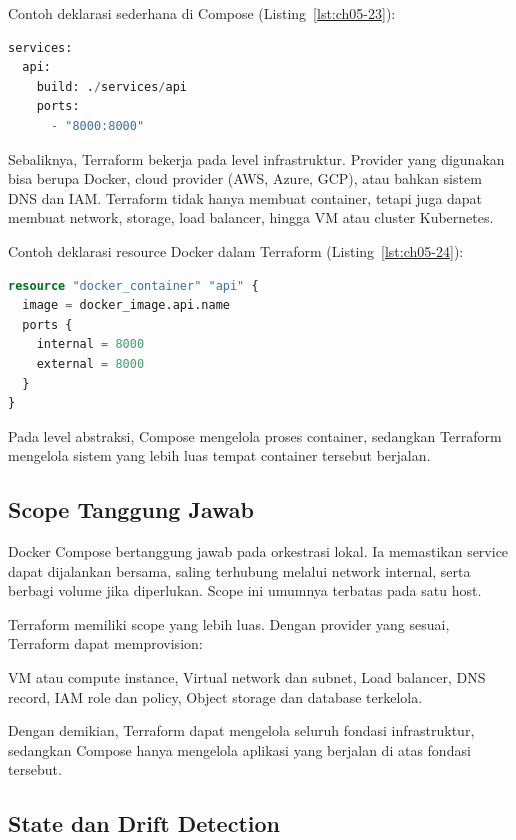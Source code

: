 Contoh deklarasi sederhana di Compose (Listing~\ref{lst:ch05-23}):

\begin{lstlisting}[language=terraform, caption={Potongan kode Terraform pada Level Abstraksi}, label={lst:ch05-23}]
services:
  api:
    build: ./services/api
    ports:
      - "8000:8000"
\end{lstlisting}

Sebaliknya, Terraform bekerja pada level infrastruktur. Provider yang digunakan bisa berupa Docker, cloud provider (AWS, Azure, GCP), atau bahkan sistem DNS dan IAM. Terraform tidak hanya membuat container, tetapi juga dapat membuat network, storage, load balancer, hingga VM atau cluster Kubernetes.

Contoh deklarasi resource Docker dalam Terraform (Listing~\ref{lst:ch05-24}):

\begin{lstlisting}[language=terraform, caption={Potongan kode Terraform pada Level Abstraksi (2)}, label={lst:ch05-24}]
resource "docker_container" "api" {
  image = docker_image.api.name
  ports {
    internal = 8000
    external = 8000
  }
}
\end{lstlisting}

Pada level abstraksi, Compose mengelola proses container, sedangkan Terraform mengelola sistem yang lebih luas tempat container tersebut berjalan.

\subsection{Scope Tanggung Jawab}

Docker Compose bertanggung jawab pada orkestrasi lokal. Ia memastikan service dapat dijalankan bersama, saling terhubung melalui network internal, serta berbagi volume jika diperlukan. Scope ini umumnya terbatas pada satu host.

Terraform memiliki scope yang lebih luas. Dengan provider yang sesuai, Terraform dapat memprovision:

VM atau compute instance,  
Virtual network dan subnet,  
Load balancer,  
DNS record,  
IAM role dan policy,  
Object storage dan database terkelola.  

Dengan demikian, Terraform dapat mengelola seluruh fondasi infrastruktur, sedangkan Compose hanya mengelola aplikasi yang berjalan di atas fondasi tersebut.

\subsection{State dan Drift Detection}

